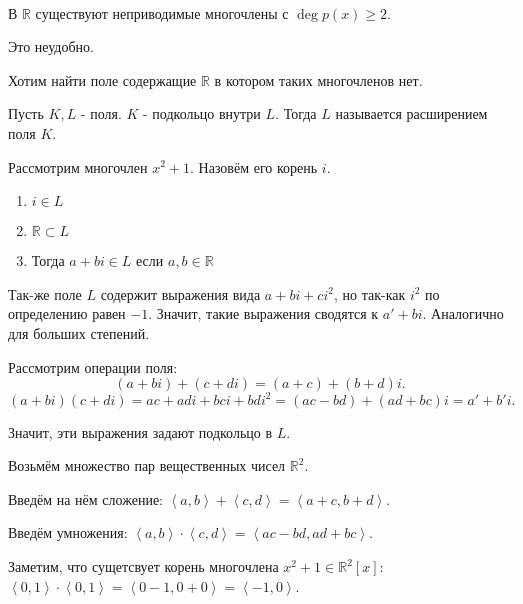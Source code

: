 
\begin{remark} ~\\[-12pt]

    В $\mathbb{R}$ существуют неприводимые многочлены с $\deg p(x) \ge 2$.

    Это неудобно.

    Хотим найти поле содержащие $\mathbb{R}$ в котором таких многочленов нет.
\end{remark}
\begin{definition} 
    Пусть $K, L$ - поля. $K$ - подкольцо внутри $L$. Тогда $L$ называется расширением поля $K$.
\end{definition}

Рассмотрим многочлен $x^2+1$. Назовём его корень $i$.

\begin{enumerate}
    \item $i\in L$
    \item $\mathbb{R} \subset L$
    \item Тогда $a+bi\in L$ если $a, b\in \mathbb{R}$
\end{enumerate}

Так-же поле $L$ содержит выражения вида $a+bi+ci^2$, но так-как $i^2$ по определению равен $-1$. Значит, такие выражения сводятся к $a'+bi$. Аналогично для больших степений.

Рассмотрим операции поля:
\[ (a+bi)+(c+di) = (a+c)+(b+d)i .\] 
\[ (a+bi)(c+di) = ac+adi+bci+bdi^2 = (ac-bd)+(ad+bc)i = a'+b'i .\]

Значит, эти выражения задают подкольцо в $L$.

Возьмём множество пар вещественных чисел $\mathbb{R}^2$.

Введём на нём сложение: $\left<a, b\right> + \left<c, d\right> = \left<a+c, b+d\right>$.

Введём умножения: $\left<a, b\right> \cdot \left<c, d\right> = \left<ac-bd, ad+bc\right>$.

Заметим, что сущетсвует корень многочлена $x^2+1\in \mathbb{R}^2[x]$: $\left<0, 1\right>\cdot \left<0, 1\right> = \left<0 - 1, 0 + 0\right> = \left<-1, 0\right>$.

